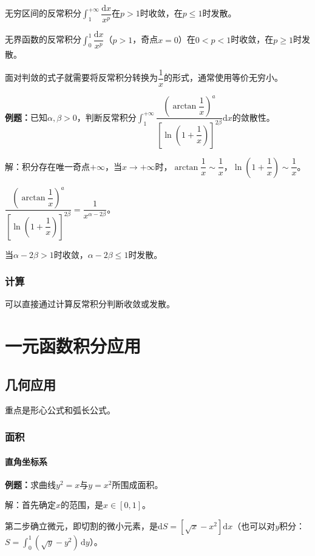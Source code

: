 \documentclass[UTF8, 12pt]{ctexart}
\begin{document}
无穷区间的反常积分$\int_1^{+\infty}\dfrac{\textrm{d}x}{x^p}$在$p>1$时收敛，在$p\leqslant1$时发散。

无界函数的反常积分$\int_0^1\dfrac{\textrm{d}x}{x^p}$（$p>1$，奇点$x=0$）在$0<p<1$时收敛，在$p\geqslant1$时发散。

面对判敛的式子就需要将反常积分转换为$\dfrac{1}{x}$的形式，通常使用等价无穷小。

\textbf{例题：}已知$\alpha,\beta>0$，判断反常积分$\displaystyle{\int_1^{+\infty}\dfrac{\left(\arctan\dfrac{1}{x}\right)^a}{\left[\ln\left(1+\dfrac{1}{x}\right)\right]^{2\beta}}\textrm{d}x}$的敛散性。

解：积分存在唯一奇点$+\infty$，当$x\to+\infty$时，$\arctan\dfrac{1}{x}\sim\dfrac{1}{x}$，$\ln\left(1+\dfrac{1}{x}\right)\sim\dfrac{1}{x}$。

$\dfrac{\left(\arctan\dfrac{1}{x}\right)^a}{\left[\ln\left(1+\dfrac{1}{x}\right)\right]^{2\beta}}=\dfrac{1}{x^{\alpha-2\beta}}$。

当$\alpha-2\beta>1$时收敛，$\alpha-2\beta\leqslant1$时发散。

\subsubsection{计算}

可以直接通过计算反常积分判断收敛或发散。

\section{一元函数积分应用}

\subsection{几何应用}

重点是形心公式和弧长公式。

\subsubsection{面积}

\paragraph{直角坐标系} \leavevmode \medskip

\textbf{例题：}求曲线$y^2=x$与$y=x^2$所围成面积。

解：首先确定$x$的范围，是$x\in[0,1]$。

第二步确立微元，即切割的微小元素，是$\textrm{d}S=[\sqrt{x}-x^2]\textrm{d}x$（也可以对$y$积分：$S=\int_0^1(\sqrt{y}-y^2)\,\textrm{d}y$）。
\end{document}
